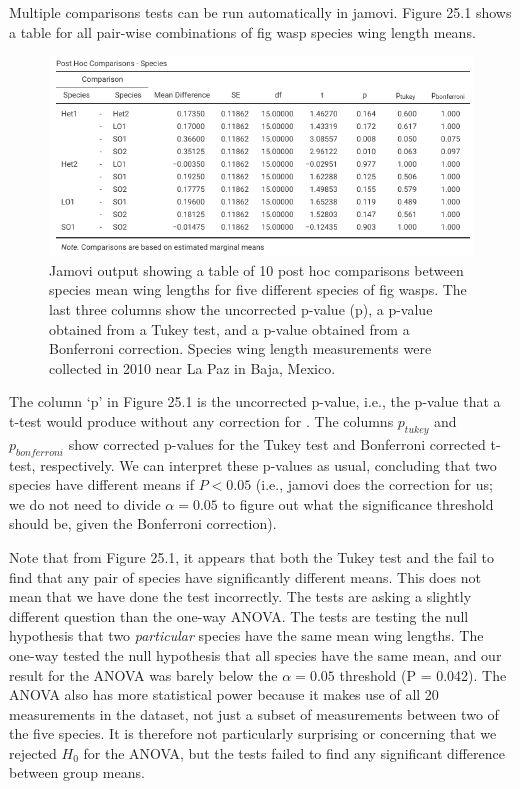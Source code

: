 \documentclass[
  openany]{krantz}
\begin{document}
Multiple comparisons tests can be run automatically in jamovi.
Figure 25.1 shows a  table for all pair-wise combinations of fig wasp species wing length means.

\begin{figure}
\includegraphics[width=1\linewidth]{img/jamovi_multiple_comparisons} \caption{Jamovi output showing a table of 10 post hoc comparisons between species mean wing lengths for five different species of fig wasps. The last three columns show the uncorrected p-value (p), a p-value obtained from a Tukey test, and a p-value obtained from a Bonferroni correction. Species wing length measurements were collected in 2010 near La Paz in Baja, Mexico.}\label{fig:unnamed-chunk-103}
\end{figure}

The column `p' in Figure 25.1 is the uncorrected p-value, i.e., the p-value that a t-test would produce without any correction for .
The columns \(p_{tukey}\) and \(p_{bonferroni}\) show corrected p-values for the Tukey test and Bonferroni corrected t-test, respectively.
We can interpret these p-values as usual, concluding that two species have different means if \(P < 0.05\) (i.e., jamovi does the correction for us; we do not need to divide \(\alpha = 0.05\) to figure out what the significance threshold should be, given the Bonferroni correction).

Note that from Figure 25.1, it appears that both the Tukey test and the  fail to find that any pair of species have significantly different means.
This does not mean that we have done the test incorrectly.
The  tests are asking a slightly different question than the one-way ANOVA.
The  tests are testing the null hypothesis that two \emph{particular} species have the same mean wing lengths.
The one-way  tested the null hypothesis that all species have the same mean, and our result for the ANOVA was barely below the \(\alpha = 0.05\) threshold (P = 0.042).
The ANOVA also has more statistical power because it makes use of all 20 measurements in the dataset, not just a subset of measurements between two of the five species.
It is therefore not particularly surprising or concerning that we rejected \(H_{0}\) for the ANOVA, but the  tests failed to find any significant difference between group means.
\end{document}
